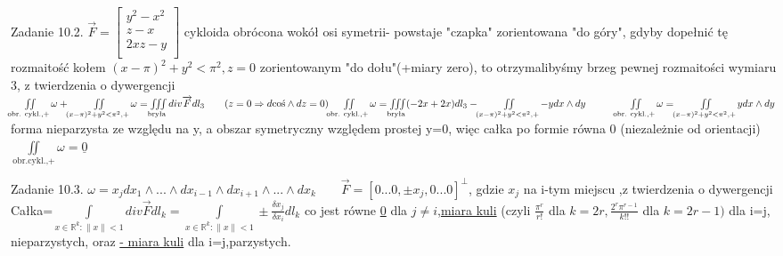 \documentclass{article}
\begin{document}
Zadanie 10.2.
\newline
\newline
$
\overrightarrow{F}=\left[\begin{array}{c}y^2-x^2\\z-x\\2xz-y\\\end{array}\right]
$
cykloida obrócona wokół osi symetrii- powstaje "czapka" zorientowana "do góry", gdyby dopełnić tę rozmaitość kołem $(x-\pi)^2+y^2<\pi^2,z=0$ zorientowanym "do dołu"(+miary zero),
to otrzymalibyśmy brzeg pewnej rozmaitości wymiaru 3, z twierdzenia o dywergencji\newline 
$
\iint\limits_{\text{obr. cykl.,+}}\omega+\iint\limits_{(x-\pi)^2+y^2<\pi^2,+}\omega=\iiint\limits_{\text{bryła}}div\overrightarrow{F}dl_3\quad\quad(z=0\Rightarrow d\text{coś}\wedge dz=0)\newline
\iint\limits_{\text{obr. cykl.,+}}\omega=\iiint\limits_{\text{bryła}}(-2x+2x)dl_3-\iint\limits_{(x-\pi)^2+y^2<\pi^2,+}-y dx\wedge dy \quad\quad\quad
\iint\limits_{\text{obr. cykl.,+}}\omega=\iint\limits_{(x-\pi)^2+y^2<\pi^2,+}y dx\wedge dy\newline
$ forma nieparzysta ze względu na y, a obszar symetryczny względem prostej y=0, więc całka po formie równa 0 (niezależnie od orientacji)
$
\iint\limits_{\text{obr.cykl.,+}}\omega=\underline{0}
$
\newline
\newline

Zadanie 10.3.
\newline
\newline
$
\omega=x_j dx_1\wedge...\wedge dx_{i-1}\wedge dx_{i+1}\wedge...\wedge dx_k\quad\quad
\overrightarrow{F}=[0...0,\pm x_j,0...0]^{\bot}
$, gdzie $x_j$ na i-tym miejscu
,z twierdzenia o dywergencji\newline
Całka=$\int\limits_{x\in\mathbb{R}^k:\lVert x\rVert<1}div\overrightarrow{F}dl_k=\int\limits_{x\in\mathbb{R}^k:\lVert x\rVert<1}\pm\frac{\delta x_j}{\delta x_i}dl_k$
co jest równe \underline{0} dla $j\neq i$,\underline{miara kuli} (czyli $\frac{\pi^r}{r!}$ dla $k=2r,\frac{2^r\pi^{r-1}}{k!!}$ dla $k=2r-1)$ dla i=j, nieparzystych,
oraz \underline{- miara kuli} dla i=j,parzystych.
\newline
\end{document}
